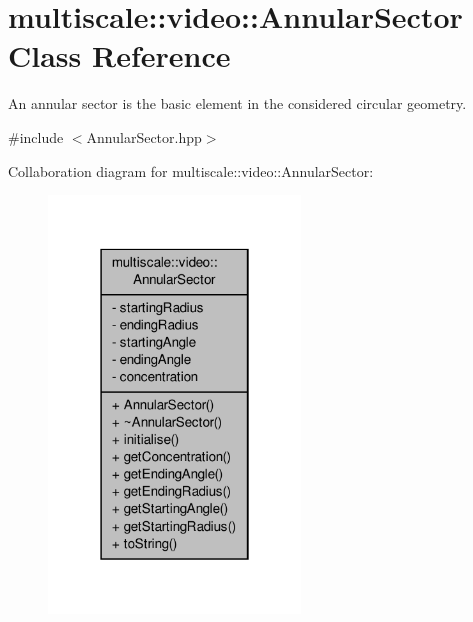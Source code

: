 \hypertarget{classmultiscale_1_1video_1_1AnnularSector}{\section{multiscale\-:\-:video\-:\-:Annular\-Sector Class Reference}
\label{classmultiscale_1_1video_1_1AnnularSector}
}


An annular sector is the basic element in the considered circular geometry.  




{\ttfamily \#include $<$Annular\-Sector.\-hpp$>$}



Collaboration diagram for multiscale\-:\-:video\-:\-:Annular\-Sector\-:\nopagebreak
\begin{figure}[H]
\begin{center}
\leavevmode
\includegraphics[width=190pt]{classmultiscale_1_1video_1_1AnnularSector__coll__graph}
\end{center}
\end{figure}
